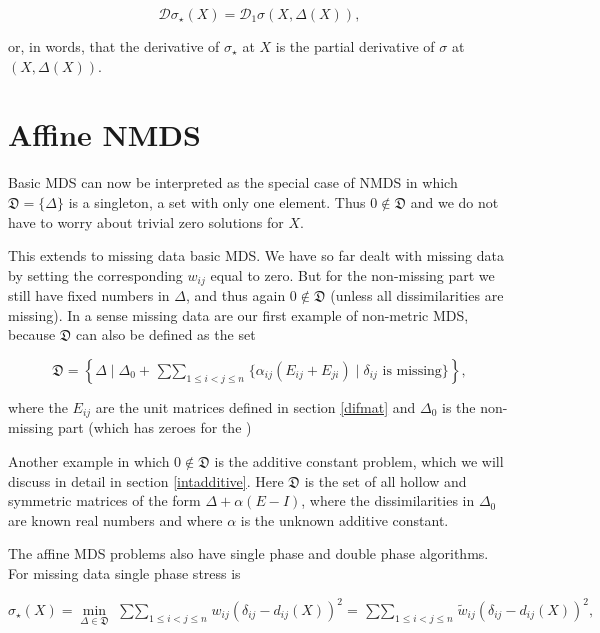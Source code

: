 \documentclass[
  12pt,
]{book}
\theoremstyle{definition}
\theoremstyle{definition}
\theoremstyle{definition}
\theoremstyle{definition}
\theoremstyle{remark}
\begin{document}
\begin{equation}
\mathcal{D}\sigma_\star(X)=\mathcal{D}_1\sigma(X,\Delta(X)),
\label{eq:nmsdanskin}
\end{equation}

or, in words, that the derivative of \(\sigma_\star\) at \(X\) is the partial derivative of \(\sigma\) at \((X,\Delta(X))\).

\hypertarget{affine-nmds}{%
\section{Affine NMDS}\label{affine-nmds}}

Basic MDS can now be interpreted as the special case of NMDS in which
\(\mathfrak{D}=\{\Delta\}\) is a singleton, a set with only one element. Thus \(0\not\in\mathfrak{D}\) and we do not have to worry about trivial zero solutions for \(X\).

This extends to missing data basic MDS. We have so far dealt with missing data by setting the corresponding \(w_{ij}\) equal to zero. But for the non-missing part we still have fixed numbers in \(\Delta\), and thus again \(0\not\in\mathfrak{D}\) (unless all dissimilarities are missing). In a sense missing data are our first example of non-metric MDS, because \(\mathfrak{D}\) can also be defined as the set

\begin{equation}
\mathfrak{D}=
\left\{\Delta\mid\Delta_0+\mathop{\sum\sum}_{1\leq i<j\leq n}\{\alpha_{ij}(E_{ij}+E_{ji})\mid \delta_{ij}\text{ is missing}\}\right\},
\label{eq:nmsmissing}
\end{equation}

where the \(E_{ij}\) are the unit matrices defined in section \ref{difmat} and \(\Delta_0\) is the non-missing part (which has zeroes for the )

Another example in which \(0\not\in\mathfrak{D}\) is the additive constant problem, which we will discuss in detail in section \ref{intadditive}. Here \(\mathfrak{D}\) is
the set of all hollow and symmetric matrices of the form
\(\Delta+\alpha(E-I)\), where the dissimilarities in \(\Delta_0\) are known real numbers and where \(\alpha\) is the unknown additive constant.

The affine MDS problems also have single phase and double phase algorithms.
For missing data single phase stress is

\begin{equation}
\sigma_\star(X)=\min_{\Delta\in\mathfrak{D}}\ \mathop{\sum\sum}_{1\leq i<j\leq n}w_{ij}(\delta_{ij}-d_{ij}(X))^2=\mathop{\sum\sum}_{1\leq i<j\leq n}\tilde w_{ij}(\delta_{ij}-d_{ij}(X))^2,
\label{eq:nmssinglemis}
\end{equation}
\end{document}

